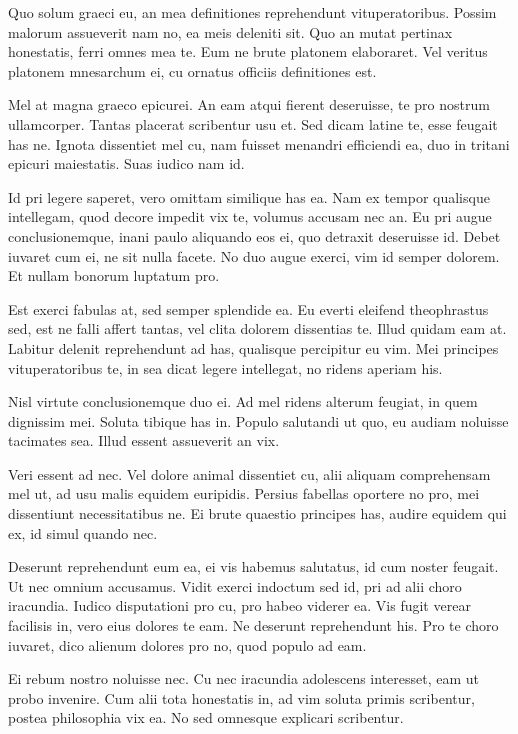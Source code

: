 \documentclass[twocolumn,twoside]{IEEEtran}
\begin{document}
 Quo solum graeci eu, an mea definitiones reprehendunt vituperatoribus. Possim
 malorum assueverit nam no, ea meis deleniti sit. Quo an mutat pertinax
 honestatis, ferri omnes mea te. Eum ne brute platonem elaboraret. Vel veritus
 platonem mnesarchum ei, cu ornatus officiis definitiones est.

 Mel at magna graeco epicurei. An eam atqui fierent deseruisse, te pro nostrum
 ullamcorper. Tantas placerat scribentur usu et. Sed dicam latine te, esse
 feugait has ne. Ignota dissentiet mel cu, nam fuisset menandri efficiendi ea,
 duo in tritani epicuri maiestatis. Suas iudico nam id.

 Id pri legere saperet, vero omittam similique has ea. Nam ex tempor qualisque
 intellegam, quod decore impedit vix te, volumus accusam nec an. Eu pri augue
 conclusionemque, inani paulo aliquando eos ei, quo detraxit deseruisse id.
 Debet iuvaret cum ei, ne sit nulla facete. No duo augue exerci, vim id semper
 dolorem. Et nullam bonorum luptatum pro.

 Est exerci fabulas at, sed semper splendide ea. Eu everti eleifend
 theophrastus sed, est ne falli affert tantas, vel clita dolorem dissentias te.
 Illud quidam eam at. Labitur delenit reprehendunt ad has, qualisque percipitur
 eu vim. Mei principes vituperatoribus te, in sea dicat legere intellegat, no
 ridens aperiam his.

 Nisl virtute conclusionemque duo ei. Ad mel ridens alterum feugiat, in quem
 dignissim mei. Soluta tibique has in. Populo salutandi ut quo, eu audiam
 noluisse tacimates sea. Illud essent assueverit an vix.

 Veri essent ad nec. Vel dolore animal dissentiet cu, alii aliquam comprehensam
 mel ut, ad usu malis equidem euripidis. Persius fabellas oportere no pro, mei
 dissentiunt necessitatibus ne. Ei brute quaestio principes has, audire equidem
 qui ex, id simul quando nec.

 Deserunt reprehendunt eum ea, ei vis habemus salutatus, id cum noster feugait.
 Ut nec omnium accusamus. Vidit exerci indoctum sed id, pri ad alii choro
 iracundia. Iudico disputationi pro cu, pro habeo viderer ea. Vis fugit verear
 facilisis in, vero eius dolores te eam. Ne deserunt reprehendunt his. Pro te
 choro iuvaret, dico alienum dolores pro no, quod populo ad eam.

 Ei rebum nostro noluisse nec. Cu nec iracundia adolescens interesset, eam ut
 probo invenire. Cum alii tota honestatis in, ad vim soluta primis scribentur,
 postea philosophia vix ea. No sed omnesque explicari scribentur.
\end{document}
